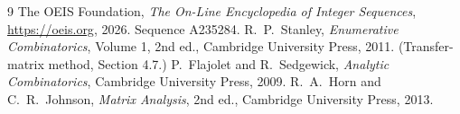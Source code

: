 \documentclass[11pt,a4paper]{article}
\theoremstyle{plain}
\theoremstyle{definition}
\begin{document}
\begin{thebibliography}{9}
 The OEIS Foundation, \emph{The On-Line Encyclopedia of Integer
Sequences}, \url{https://oeis.org}, 2026. Sequence A235284.
 R.~P.~Stanley, \emph{Enumerative Combinatorics}, Volume 1, 2nd ed.,
Cambridge University Press, 2011. (Transfer-matrix method, Section 4.7.)
 P.~Flajolet and R.~Sedgewick, \emph{Analytic Combinatorics}, Cambridge
University Press, 2009.
 R.~A.~Horn and C.~R.~Johnson, \emph{Matrix Analysis}, 2nd ed., Cambridge
University Press, 2013.
\end{thebibliography}
\end{document}
